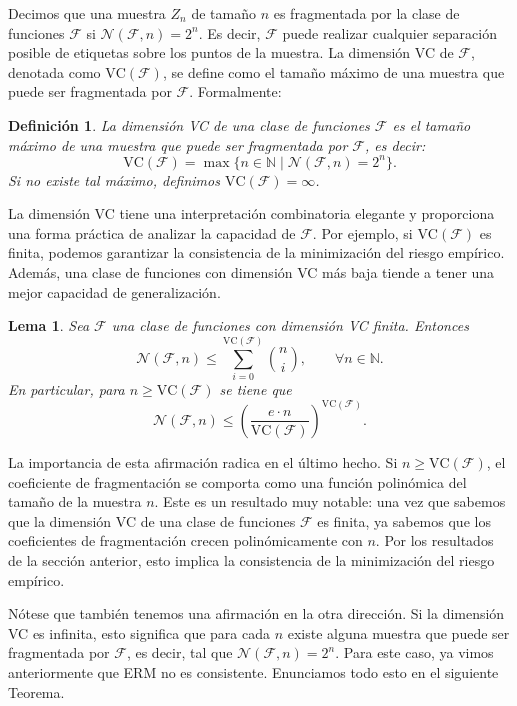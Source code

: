 \documentclass{report}
\newtheorem{lem}{Lema}[section]
\newtheorem{dfn}{Definición}[section]
\begin{document}
Decimos que una muestra \(Z_n\) de tamaño \(n\) es fragmentada por la clase de funciones
\(\mathcal{F}\) si \(\mathcal{N}(\mathcal{F}, n) = 2^n\). Es decir, \(\mathcal{F}\) puede realizar cualquier separación posible de etiquetas sobre
los puntos de la muestra. La dimensión VC de \(\mathcal{F}\), denotada como \(\text{VC}(\mathcal{F})\), se define como el tamaño
máximo de una muestra que puede ser fragmentada por \(\mathcal{F}\). Formalmente:

\begin{dfn}
La dimensión VC de una clase de funciones \(\mathcal{F}\) es el tamaño máximo de una muestra que puede ser fragmentada por \(\mathcal{F}\), es decir:
\[
\text{VC}(\mathcal{F}) = \max \{n \in \mathbb{N} \mid \mathcal{N}(\mathcal{F}, n) = 2^n\}.
\]
Si no existe tal máximo, definimos \(\text{VC}(\mathcal{F}) = \infty\).
\end{dfn}

La dimensión VC tiene una interpretación combinatoria
elegante y proporciona una forma práctica de analizar la capacidad de \(\mathcal{F}\). Por ejemplo, si \(\text{VC}(\mathcal{F})\)
es finita, podemos garantizar la consistencia de la minimización del riesgo empírico. Además, una clase de funciones
con dimensión VC más baja tiende a tener una mejor capacidad de generalización.

\begin{lem}\label{def:cota combinatoria de dimensión VC}
    Sea $\mathcal{F}$ una clase de funciones con dimensión VC finita. Entonces
    \[
    \mathcal{N}(\mathcal{F}, n) \leq \sum_{i=0}^{\text{VC}(\mathcal{F})} \binom{n}{i} , \qquad \forall n \in \mathbb{N}.
    \]
    En particular, para $n\geq \text{VC}(\mathcal{F})$ se tiene que
    \[
    \mathcal{N}(\mathcal{F}, n) \leq \left(\frac{e\cdot n}{\text{VC}(\mathcal{F})}\right)^{\text{VC}(\mathcal{F})}.
    \]
\end{lem}

La importancia de esta afirmación radica en el último hecho. Si \( n \geq \text{VC}(\mathcal{F}) \),
el coeficiente de fragmentación se comporta como una función polinómica del tamaño de la muestra \( n \).
Este es un resultado muy notable: una vez que sabemos que la dimensión VC de una clase de funciones
\(\mathcal{F}\) es finita, ya sabemos que los coeficientes de fragmentación crecen polinómicamente con \( n \).
Por los resultados de la sección anterior, esto implica la consistencia de la minimización del riesgo empírico.

Nótese que también tenemos una afirmación en la otra dirección. Si la dimensión VC es infinita, esto significa
que para cada \( n \) existe alguna muestra que puede ser fragmentada por \(\mathcal{F}\), es decir, tal que
\(\mathcal{N}(\mathcal{F}, n) = 2^n. \) Para este caso, ya vimos anteriormente que ERM no es consistente.
Enunciamos todo esto en el siguiente Teorema.
\end{document}
